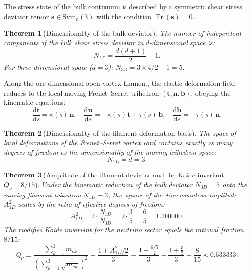 \documentclass[11pt,a4paper]{article}
\newtheorem{theorem}{Theorem}
\theoremstyle{definition}
\theoremstyle{remark}
\begin{document}
The stress state of the bulk continuum is described by a symmetric shear stress deviator tensor $\mathbf{s} \in \mathrm{Sym}_0(3)$ with the condition $\operatorname{Tr}(\mathbf{s}) = 0$.
	
\begin{theorem}[Dimensionality of the bulk deviator]
\label{thm:deviator_dim_five}
The number of independent components of the bulk shear stress deviator in $d$-dimensional space is:
\begin{equation}
	N_{3D} = \frac{d(d + 1)}{2} - 1.
\label{eq:deviator_dim_formula}
\end{equation}
For three-dimensional space ($d = 3$): $N_{3D} = 3 \times 4 / 2 - 1 = 5$.
\end{theorem}
	
Along the one-dimensional open vortex filament, the elastic deformation field reduces to the local moving Frenet--Serret trihedron $(\mathbf{t}, \mathbf{n}, \mathbf{b})$, obeying the kinematic equations:
\begin{equation}
	\frac{\mathrm{d}\mathbf{t}}{\mathrm{d}s} = \kappa(s) \, \mathbf{n}, \quad
	\frac{\mathrm{d}\mathbf{n}}{\mathrm{d}s} = -\kappa(s) \, \mathbf{t} + \tau(s) \, \mathbf{b}, \quad
	\frac{\mathrm{d}\mathbf{b}}{\mathrm{d}s} = -\tau(s) \, \mathbf{n}.
\label{eq:frenet_serret_equations}
\end{equation}
	
\begin{theorem}[Dimensionality of the filament deformation basis]
\label{thm:frenet_basis_dim}
The space of local deformations of the Frenet--Serret vortex cord contains exactly as many degrees of freedom as the dimensionality of the moving trihedron space:
\begin{equation}
	N_{1D} = d = 3.
\label{eq:frenet_dim_three}
\end{equation}
\end{theorem}
	
\begin{theorem}[Amplitude of the filament deviator and the Koide invariant $Q_\nu = 8/15$]
\label{thm:neutrino_koide_derivation}
Under the kinematic reduction of the bulk deviator $N_{3D} = 5$ onto the moving filament trihedron $N_{1D} = 3$, the square of the dimensionless amplitude $A_{1D}^2$ scales by the ratio of effective degrees of freedom:
\begin{equation}
	A_{1D}^2 = 2 \cdot \frac{N_{1D}}{N_{3D}} = 2 \cdot \frac{3}{5} = \frac{6}{5} = 1.200000.
\label{eq:amplitude_1D_exact}
\end{equation}
The modified Koide invariant for the neutrino sector equals the rational fraction $8/15$:
\begin{equation}
	Q_\nu \equiv \frac{\sum_{k=1}^3 m_{\nu k}}{\left(\sum_{k=1}^3 \sqrt{m_{\nu k}}\right)^2} = \frac{1 + A_{1D}^2 / 2}{3} = \frac{1 + \frac{6/5}{2}}{3} = \frac{1 + \frac{3}{5}}{3} = \frac{8}{15} \approx 0.533333.
	\label{eq:neutrino_koide_exact}
\end{equation}
\end{theorem}
\end{document}
